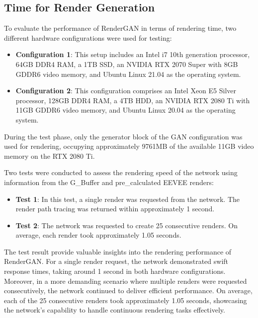 \subsection{Time for Render Generation}
\label{subsec:RenderGAN_result_time}

To evaluate the performance of RenderGAN in terms of rendering time, two different hardware configurations were used for testing:

\begin{itemize}
\item \textbf{Configuration 1}: This setup includes an Intel i7 10th generation processor, 64GB DDR4 RAM, a 1TB SSD, an NVIDIA RTX 2070 Super with 8GB GDDR6 video memory, and Ubuntu Linux 21.04 as the operating system.
\item \textbf{Configuration 2}: This configuration comprises an Intel Xeon E5 Silver processor, 128GB DDR4 RAM, a 4TB HDD, an NVIDIA RTX 2080 Ti with 11GB GDDR6 video memory, and Ubuntu Linux 20.04 as the operating system.
\end{itemize}

During the test phase, only the generator block of the GAN configuration was used for rendering, occupying approximately 9761MB of the available 11GB video memory on the RTX 2080 Ti.

Two tests were conducted to assess the rendering speed of the network using information from the G_Buffer and pre_calculated EEVEE renders:

\begin{itemize}
\item \textbf{Test 1}: In this test, a single render was requested from the network. The render path tracing was returned within approximately 1 second.
\item \textbf{Test 2}: The network was requested to create 25 consecutive renders. On average, each render took approximately 1.05 seconds.
\end{itemize}

The test result provide valuable insights into the rendering performance of RenderGAN. For a single render request, the network demonstrated swift response times, taking around 1 second in both hardware configurations. Moreover, in a more demanding scenario where multiple renders were requested consecutively, the network continued to deliver efficient performance. On average, each of the 25 consecutive renders took approximately 1.05 seconds, showcasing the network's capability to handle continuous rendering tasks effectively.


